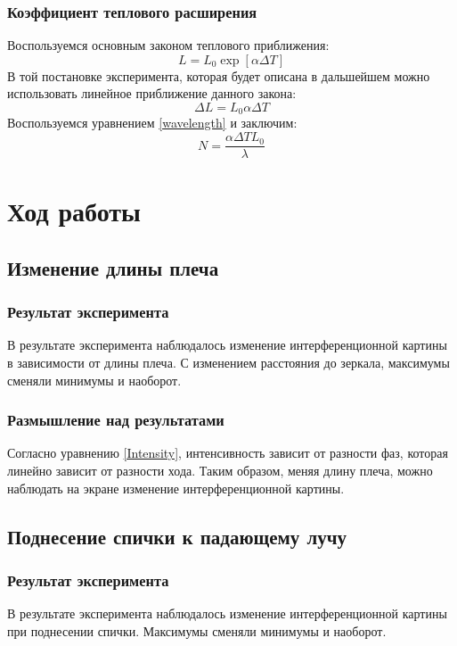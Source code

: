 \documentclass[%
reprint,
russian,
 amsmath,amssymb,
 aps,
]{revtex4-2}
\begin{document}
\subsubsection{\label{sec:level3}Коэффициент теплового расширения}
Воспользуемся основным законом теплового приближения:
\begin{equation*}
    L = L_0 \exp[\alpha \Delta T]
\end{equation*}
В той постановке эксперимента, которая будет описана в дальшейшем можно использовать линейное приближение данного закона:
\begin{equation*}
    \Delta L = L_0 \alpha \Delta T
\end{equation*}
Воспользуемся уравнением \ref{wavelength} и заключим:
\begin{equation}
    \label{heat}
    N = \frac{\alpha \Delta T L_0}{\lambda}
\end{equation}
\section{Ход работы}
\subsection{Изменение длины плеча}
\subsubsection{Результат эксперимента}
В результате эксперимента наблюдалось изменение интерференционной картины в зависимости от длины плеча. С изменением расстояния до зеркала, максимумы сменяли минимумы и наоборот.
\subsubsection{Размышление над результатами}
Согласно уравнению \ref{Intensity}, интенсивность зависит от разности фаз, которая линейно зависит от разности хода. Таким образом, меняя длину плеча, можно наблюдать на экране изменение интерференционной картины.
\subsection{Поднесение спички к падающему лучу}
\subsubsection{Результат эксперимента}
В результате эксперимента наблюдалось изменение интерференционной картины при поднесении спички. Максимумы сменяли минимумы и наоборот.
\end{document}
